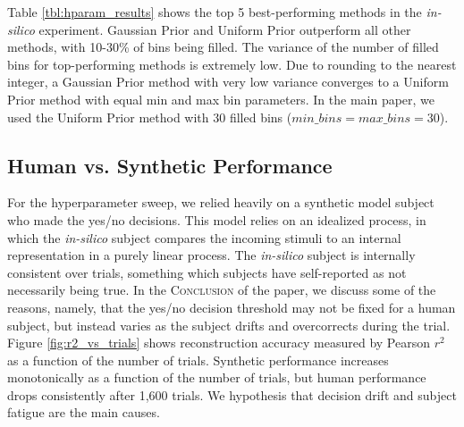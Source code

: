 \documentclass[journal]{IEEEtran}
\begin{document}


Table \ref{tbl:hparam_results} shows the top 5 best-performing methods
in the \textit{in-silico} experiment.
Gaussian Prior and Uniform Prior outperform all other methods,
with 10-30\% of bins being filled.
The variance of the number of filled bins for top-performing methods
is extremely low.
Due to rounding to the nearest integer, a Gaussian Prior method with very low variance
converges to a Uniform Prior method with equal min and max bin parameters.
In the main paper, we used the Uniform Prior method with 30 filled bins ($min \_ bins = max \_ bins = 30$).

\subsection{Human vs. Synthetic Performance}

For the hyperparameter sweep, we relied heavily on a synthetic model subject
who made the yes/no decisions.
This model relies on an idealized process,
in which the \textit{in-silico} subject compares
the incoming stimuli to an internal representation in a purely linear process.
The \textit{in-silico} subject is internally consistent over trials,
something which subjects have self-reported as not necessarily being true.
In the \textsc{Conclusion} of the paper, we discuss some of the reasons,
namely, that the yes/no decision threshold may not be fixed for a human subject,
but instead varies as the subject drifts and overcorrects during the trial.
Figure \ref{fig:r2_vs_trials} shows
reconstruction accuracy measured by Pearson $r^2$ as a function of the
number of trials.
Synthetic performance increases monotonically as a function of the number of trials,
but human performance drops consistently after 1,600 trials.
We hypothesis that decision drift and subject fatigue are the main causes.
\end{document}
